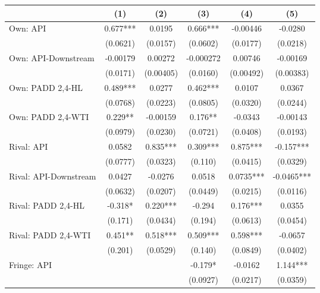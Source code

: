 {
\def\sym#1{\ifmmode^{#1}\else\(^{#1}\)\fi}
\begin{tabular}{l*{5}{c}}
\toprule
                &\multicolumn{1}{c}{(1)}   &\multicolumn{1}{c}{(2)}   &\multicolumn{1}{c}{(3)}   &\multicolumn{1}{c}{(4)}   &\multicolumn{1}{c}{(5)}   \\
\midrule
Own: API        &    0.677***&   0.0195   &    0.666***& -0.00446   &  -0.0280   \\
                & (0.0621)   & (0.0157)   & (0.0602)   & (0.0177)   & (0.0218)   \\
\addlinespace
Own: API-Downstream& -0.00179   &  0.00272   &-0.000272   &  0.00746   & -0.00169   \\
                & (0.0171)   &(0.00405)   & (0.0160)   &(0.00492)   &(0.00383)   \\
\addlinespace
Own: PADD 2,4-HL&    0.489***&   0.0277   &    0.462***&   0.0107   &   0.0367   \\
                & (0.0768)   & (0.0223)   & (0.0805)   & (0.0320)   & (0.0244)   \\
\addlinespace
Own: PADD 2,4-WTI&    0.229** & -0.00159   &    0.176** &  -0.0343   & -0.00143   \\
                & (0.0979)   & (0.0230)   & (0.0721)   & (0.0408)   & (0.0193)   \\
\addlinespace
Rival: API      &   0.0582   &    0.835***&    0.309***&    0.875***&   -0.157***\\
                & (0.0777)   & (0.0323)   &  (0.110)   & (0.0415)   & (0.0329)   \\
\addlinespace
Rival: API-Downstream&   0.0427   &  -0.0276   &   0.0518   &   0.0735***&  -0.0465***\\
                & (0.0632)   & (0.0207)   & (0.0449)   & (0.0215)   & (0.0116)   \\
\addlinespace
Rival: PADD 2,4-HL&   -0.318*  &    0.220***&   -0.294   &    0.176***&   0.0355   \\
                &  (0.171)   & (0.0434)   &  (0.194)   & (0.0613)   & (0.0454)   \\
\addlinespace
Rival: PADD 2,4-WTI&    0.451** &    0.518***&    0.509***&    0.598***&  -0.0657   \\
                &  (0.201)   & (0.0529)   &  (0.140)   & (0.0849)   & (0.0402)   \\
\addlinespace
Fringe: API     &            &            &   -0.179*  &  -0.0162   &    1.144***\\
                &            &            & (0.0927)   & (0.0217)   & (0.0359)   \\

\end{tabular}}

